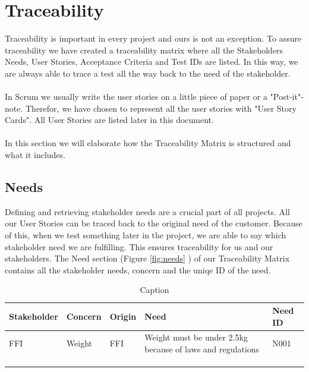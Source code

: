 \section{Traceability}
Traceability is important in every project and ours is not an exception. To assure traceability we have created a traceability matrix where all the Stakeholders Needs, User Stories, Acceptance Criteria and Test IDs are listed. In this way, we are always able to trace a test all the way back to the need of the stakeholder. \\
\\
In Scrum we usually write the user stories on a little piece of paper or a "Post-it"-note. Therefor, we have chosen to represent all the user stories with "User Story Cards". All User Stories are listed later in this document.  \\
\\
In this section we will elaborate how the Traceability Matrix is structured and what it includes.

\subsection{Needs}
Defining and retrieving stakeholder needs are a crucial part of all projects. All our User Stories can be traced back to the original need of the customer. Because of this, when we test something later in the project, we are able to say which stakeholder need we are fulfilling. This ensures traceability for us and our stakeholders. The Need section (Figure \ref{fig:needs} ) of our Traceability Matrix contains all the stakeholder needs, concern and the uniqe ID of the need. 

\begin{table}[h]
    \centering
    \begin{tabular}{|m{2cm} p{2cm} p{2cm} p{7cm} p{1.5cm}|}
\hline
\rowcolor{cadetgrey}    Stakeholder & Concern & Origin & Need & Need ID \\ \hline
                            FFI & Weight & FFI & Weight must be under 2.5kg because of laws and regulations & N001 \\ 
\rowcolor{gainsboro}         & & & & \\ 
                             & & & & \\ 
\rowcolor{gainsboro}         & & & & \\ 
\hline    
    \end{tabular}
    \caption{Caption}
\end{table}



